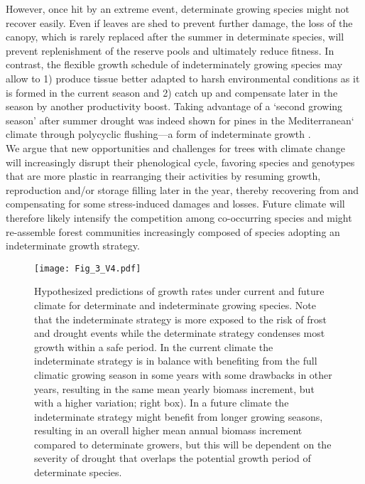 \documentclass{article}
\begin{document}
However, once hit by an extreme event, determinate growing species might not recover easily. Even if leaves are shed to prevent further damage, the loss of the canopy, which is rarely replaced after the summer in determinate species, will prevent replenishment of the reserve pools and ultimately reduce fitness. In contrast, the flexible growth schedule of indeterminately growing species may allow to 1) produce tissue better adapted to harsh environmental conditions as it is formed in the current season and 2) catch up and compensate later in the season by another productivity boost. Taking advantage of a `second growing season' after summer drought was indeed shown for pines in the Mediterranean` climate through polycyclic flushing---a form of indeterminate growth \citep[Figure \ref{fig:fig_2xxx}]{girardPolycyclismFundamentalTree2011}. \\

We argue that new opportunities and challenges for trees with climate change will increasingly disrupt their phenological cycle, favoring species and genotypes that are more plastic in rearranging their activities by resuming growth, reproduction and/or storage filling later in the year, thereby recovering from and compensating for some stress-induced damages and losses. Future climate will therefore likely intensify the competition among co-occurring species and might re-assemble forest communities increasingly composed of species adopting an indeterminate growth strategy.
	
	
								\begin{figure}
								\centering
								\texttt{[image: Fig\_3\_V4.pdf]} 
								\caption{Hypothesized predictions of growth rates under current and future climate for determinate and indeterminate growing species. Note that the indeterminate strategy is more exposed to the risk of frost and drought events while the determinate strategy condenses most growth within a safe period. In the current climate the indeterminate strategy is in balance with benefiting from the full climatic growing season in some years with some drawbacks in other years, resulting in the same mean yearly biomass increment, but with a higher variation; right box). In a future climate the indeterminate strategy might benefit from longer growing seasons, resulting in an overall higher mean annual biomass increment compared to determinate growers, but this will be dependent on the severity of drought that overlaps the potential growth period of determinate species.}
								\label{fig:fig_4xxx}
							\end{figure}
	\pagebreak
	
\end{document}
